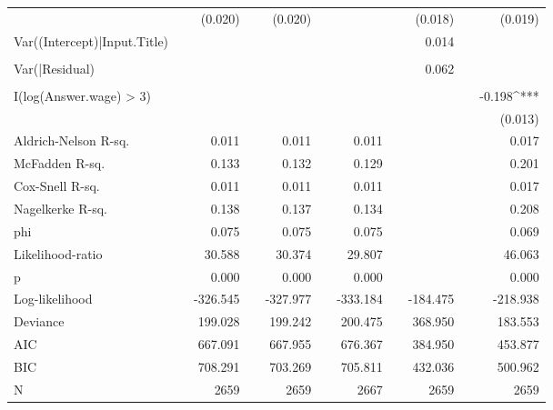 \begin{tabular}{lcD{.}{.}{7}cD{.}{.}{7}cD{.}{.}{7}cD{.}{.}{7}cD{.}{.}{7}}
                             &  &  (0.020)     &&  (0.020)     &&              &&  (0.018)     &&  (0.019)    \\
Var((Intercept)|Input.Title) &  &              &&              &&              &&   0.014      &&             \\
                             &  &              &&              &&              &&              &&             \\
Var(|Residual)               &  &              &&              &&              &&   0.062      &&             \\
                             &  &              &&              &&              &&              &&             \\
I(log(Answer.wage) > 3)      &  &              &&              &&              &&              && -0.198^{***}\\
                             &  &              &&              &&              &&              &&  (0.013)    \\
\midrule
Aldrich-Nelson R-sq.         &  &      0.011   &&      0.011   &&      0.011   &&              &&      0.017  \\
McFadden R-sq.               &  &      0.133   &&      0.132   &&      0.129   &&              &&      0.201  \\
Cox-Snell R-sq.              &  &      0.011   &&      0.011   &&      0.011   &&              &&      0.017  \\
Nagelkerke R-sq.             &  &      0.138   &&      0.137   &&      0.134   &&              &&      0.208  \\
phi                          &  &      0.075   &&      0.075   &&      0.075   &&              &&      0.069  \\
Likelihood-ratio             &  &     30.588   &&     30.374   &&     29.807   &&              &&     46.063  \\
p                            &  &      0.000   &&      0.000   &&      0.000   &&              &&      0.000  \\
Log-likelihood               &  &   -326.545   &&   -327.977   &&   -333.184   &&   -184.475   &&   -218.938  \\
Deviance                     &  &    199.028   &&    199.242   &&    200.475   &&    368.950   &&    183.553  \\
AIC                          &  &    667.091   &&    667.955   &&    676.367   &&    384.950   &&    453.877  \\
BIC                          &  &    708.291   &&    703.269   &&    705.811   &&    432.036   &&    500.962  \\
N                            &  &   2659       &&   2659       &&   2667       &&   2659       &&   2659      \\
\bottomrule
\end{tabular}
